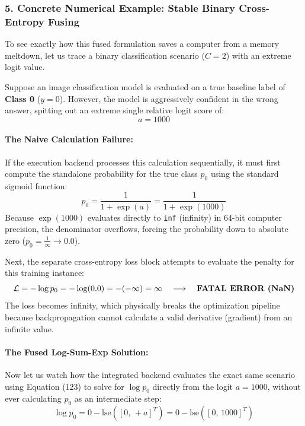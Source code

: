 \documentclass{article}
\begin{document}
\subsubsection*{5. Concrete Numerical Example: Stable Binary Cross-Entropy Fusing}

To see exactly how this fused formulation saves a computer from a memory meltdown, let us trace a binary classification scenario ($C=2$) with an extreme logit value.

Suppose an image classification model is evaluated on a true baseline label of \textbf{Class 0} ($y=0$). However, the model is aggressively confident in the wrong answer, spitting out an extreme single relative logit score of:
\begin{equation}
    a = 1000
\end{equation}

\paragraph{The Naive Calculation Failure:}
If the execution backend processes this calculation sequentially, it must first compute the standalone probability for the true class $p_0$ using the standard sigmoid function:
\begin{equation}
    p_0 = \frac{1}{1 + \exp(a)} = \frac{1}{1 + \exp(1000)}
\end{equation}
Because $\exp(1000)$ evaluates directly to \texttt{inf} (infinity) in 64-bit computer precision, the denominator overflows, forcing the probability down to absolute zero ($p_0 = \frac{1}{\infty} \to 0.0$). 

Next, the separate cross-entropy loss block attempts to evaluate the penalty for this training instance:
\begin{equation}
    \mathcal{L} = -\log p_0 = -\log(0.0) = -(-\infty) = \mathbf{\infty} \quad \longrightarrow \quad \text{\textbf{FATAL ERROR (NaN)}}
\end{equation}
The loss becomes infinity, which physically breaks the optimization pipeline because backpropagation cannot calculate a valid derivative (gradient) from an infinite value.

\paragraph{The Fused Log-Sum-Exp Solution:}
Now let us watch how the integrated backend evaluates the exact same scenario using Equation (123) to solve for $\log p_0$ directly from the logit $a = 1000$, without ever calculating $p_0$ as an intermediate step:
\begin{equation}
    \log p_0 = 0 - \text{lse}([0, \, +a]^T) = 0 - \text{lse}([0, \, 1000]^T)
\end{equation}
\end{document}
